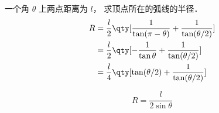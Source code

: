 
一个角 $\theta$ 上两点距离为 $l$， 求顶点所在的弧线的半径．
\begin{equation}
\begin{aligned}
R &= \frac{l}{2}\qty[\frac{1}{\tan(\pi - \theta)} + \frac{1}{\tan(\theta/2)}]\\
&= \frac{l}{2}\qty[-\frac{1}{\tan\theta} + \frac{1}{\tan(\theta/2)}]\\
&= \frac{l}{4}\qty[\tan(\theta/2) + \frac{1}{\tan(\theta/2)}]
\end{aligned}
\end{equation}

\begin{equation}
R = \frac{l}{2\sin\theta}
\end{equation}

